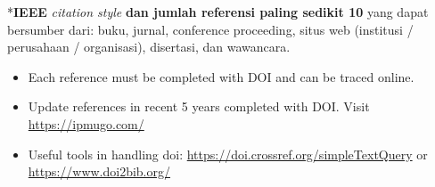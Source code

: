 \documentclass[12pt, a4paper, onecolumn, oneside, final]{report1}
\begin{document}
\onehalfspacing

\pagestyle{fancy}

%
%

%
%

\BgThispage






%
%
\singlespacing


% 
% 



*\textbf{IEEE} \textit{citation style} \textbf{dan jumlah referensi paling sedikit 10} yang dapat bersumber dari: buku, jurnal, conference proceeding, situs web (institusi / perusahaan / organisasi), disertasi, dan wawancara.
\begin{itemize}
    \item  Each reference must be completed with DOI and can be traced online.
    \item  Update references in recent 5 years completed with DOI. Visit \url{https://ipmugo.com/} \item  Useful tools in handling doi:  \url{https://doi.crossref.org/simpleTextQuery} or  \url{https://www.doi2bib.org/}
\end{itemize}

\onehalfspacing

%
%


\end{document}

